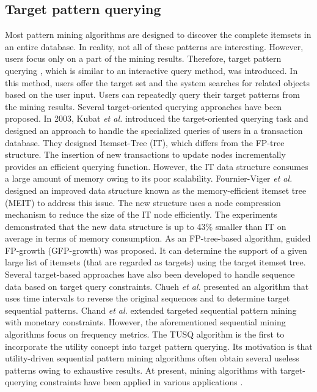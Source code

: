 \documentclass[journal]{IEEEtran}
\begin{document}
\subsection{Target pattern querying}

Most pattern mining algorithms are designed to discover the complete itemsets in an entire database. In reality, not all of these patterns are interesting. However, users focus only on a part of the mining results. Therefore, target pattern querying \cite{kubat2003itemset}, which is similar to an interactive query method, was introduced. In this method, users offer the target set and the system searches for related objects based on the user input. Users can repeatedly query their target patterns from the mining results. Several target-oriented querying approaches have been proposed. In 2003, Kubat \textit{et al.} \cite{kubat2003itemset} introduced the target-oriented querying task and designed an approach to handle the specialized queries of users in a transaction database. They designed Itemset-Tree (IT), which differs from the FP-tree structure. The insertion of new transactions to update nodes incrementally provides an efficient querying function. However, the IT data structure consumes a large amount of memory owing to its poor scalability. Fournier-Viger \textit{et al.} \cite{fournier2013meit} designed an improved data structure known as the memory-efficient itemset tree (MEIT) to address this issue. The new structure uses a node compression mechanism to reduce the size of the IT node efficiently. The experiments demonstrated that the new data structure is up to 43\% smaller than IT on average in terms of memory consumption. As an FP-tree-based algorithm, guided FP-growth (GFP-growth) \cite{shabtay2018guided} was proposed. It can determine the support of a given large list of itemsets (that are regarded as targets) using the target itemset tree. Several target-based approaches have also been developed to handle sequence data based on target query constraints. Chueh \textit{et al.} \cite{chueh2010mining} presented an algorithm that uses time intervals to reverse the original sequences and to determine target sequential patterns. Chand \textit{et al.} \cite{chand2012target} extended targeted sequential pattern mining with monetary constraints. However, the aforementioned sequential mining algorithms focus on frequency metrics. The TUSQ algorithm \cite{zhang2021tusq} is the first to incorporate the utility concept into target pattern querying. Its motivation is that utility-driven sequential pattern mining algorithms often obtain several useless patterns owing to exhaustive results. At present, mining algorithms with target-querying constraints have been applied in various applications \cite{abeysinghe2017query, abeysinghe2018query}.
\end{document}
